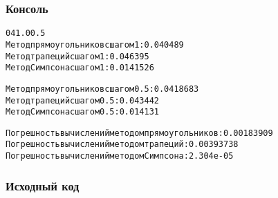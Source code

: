 \subsubsection{Консоль}
\begin{alltt}
0 4 1.0 0.5
Метод прямоугольников с шагом 1: 0.040489
Метод трапеций с шагом 1: 0.046395
Метод Симпсона с шагом 1: 0.0141526

Метод прямоугольников с шагом 0.5: 0.0418683
Метод трапеций с шагом 0.5: 0.043442
Метод Симпсона с шагом 0.5: 0.014131

Погрешность вычислений методом прямоугольников: 0.00183909
Погрешность вычислений методом трапеций: 0.00393738
Погрешность вычислений методом Симпсона: 2.304e-05
\end{alltt}
\pagebreak

\subsubsection{Исходный код}

\pagebreak
